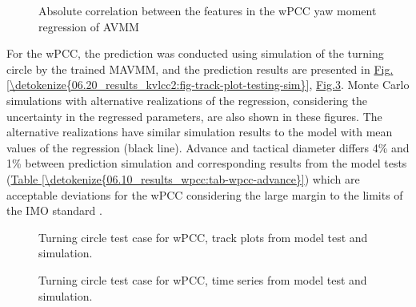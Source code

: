 \documentclass[review]{elsarticle}
\begin{document}
 \begin{figure}[H]
 \centering
 \capstart

 \noindent{}
 \caption{Absolute correlation between the features in the wPCC yaw moment regression of AVMM}\label{\detokenize{06.10_results_wpcc:fig-ncorr}}\end{figure}

  
For the wPCC, the prediction was conducted using simulation of the turning circle by the trained MAVMM, and the prediction results are presented in \hyperref[\detokenize{06.20_results_kvlcc2:fig-track-plot-testing-sim}]{Fig.\@ \ref{\detokenize{06.20_results_kvlcc2:fig-track-plot-testing-sim}}}, \hyperref[\detokenize{06.10_results_wpcc:fig-testing-sim}]{Fig.\@ \ref{\detokenize{06.10_results_wpcc:fig-testing-sim}}}. Monte Carlo simulations with alternative realizations of the regression, considering the uncertainty in the regressed parameters, are also shown in these figures. The alternative realizations have similar simulation results to the model with mean values of the regression (black line).
Advance and tactical diameter \cite{imo_standards_2002} differs 4\% and 1\% between prediction simulation and corresponding results from the model tests (\hyperref[\detokenize{06.10_results_wpcc:tab-wpcc-advance}]{Table \ref{\detokenize{06.10_results_wpcc:tab-wpcc-advance}}})
which are acceptable deviations for the wPCC considering the large margin to the limits of the IMO standard \cite{imo_standards_2002}.

 \begin{figure}[H]
 \centering
 \capstart

 \noindent{}
 \caption{Turning circle test case for wPCC, track plots from model test and simulation.}\label{\detokenize{06.10_results_wpcc:fig-track-plot-testing-sim}}\end{figure}

 \begin{figure}[H]
 \centering
 \capstart

 \noindent{}
 \caption{Turning circle test case for wPCC, time series from model test and simulation.}\label{\detokenize{06.10_results_wpcc:fig-testing-sim}}\end{figure}
\end{document}
